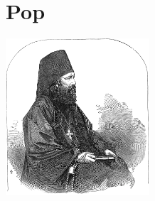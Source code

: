 \documentclass[11pt, twoside]{book}
\let\clearpage\relax
\begin{document}
\chapter{Pop}
\begin{center}
    \includegraphics[width=0.4\textwidth]{images/pop.png}
\end{center}
\pagestyle{pop}





\clearpage{\mbox{}\pagestyle{empty}\cleardoublepage}
\end{document}
